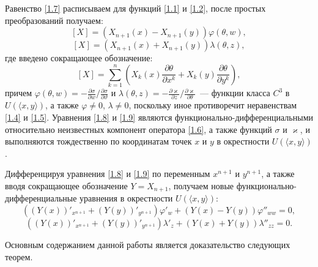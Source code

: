 Равенство \eqref{1.7} расписываем  для  функций \eqref{1.1} и \eqref{1.2}, после простых преобразований получаем:
\begin{equation}\label{1.8}[X] = (X_{n+1}(x) - X_{n+1}(y))\varphi(\theta,w), \end{equation}
\begin{equation}\label{1.9}\left[X\right] = (X_{n+1}(x) + X_{n+1}(y))\lambda(\theta,z),\end{equation}
где введено сокращающее обозначение:
$$[X] = \sum^{n}_{k=1}\left(X_k(x)\dfrac{\partial\theta}{\partial x^k} +
X_k(y)\dfrac{\partial\theta}{\partial y^k}\right),$$ причем $\varphi(\theta,w) = -\frac{\partial \sigma}{\partial w}/\frac{\partial \sigma}{\partial \vartheta}$ и $\lambda(\theta,z) = -\frac{\partial \varkappa}{\partial z}/\frac{\partial \varkappa}{\partial \theta}$~--- функции  класса $C^3$ в $U(\langle x,y\rangle)$, а также $\varphi\ne0$, $\lambda\ne0$, поскольку иное противоречит неравенствам \eqref{1.4} и \eqref{1.5}.
Уравнения  \eqref{1.8} и \eqref{1.9}  являются  функционально-дифференциальными относительно неизвестных компонент оператора \eqref{1.6}, а также функций $\sigma$ и $\varkappa$, и выполняются  тождественно по координатам точек $x$ и $y$ в окрестности $U(\langle x,y\rangle)$.

Дифференцируя уравнения \eqref{1.8} и \eqref{1.9} по переменным $x^{n+1}$ и $y^{n+1}$, а также вводя сокращающее обозначение $Y= X_{n+1}$, получаем новые функционально-дифференциальные уравнения в окрестности $U(\langle x,y\rangle)$:
\begin{equation}\label{1.10} ((Y(x))'_{x^{n+1}} + (Y(y))'_{y^{n+1}})\varphi'_{w} + (Y(x) - Y(y))\varphi''_{ww} = 0, \end{equation}
\begin{equation}\label{1.11} ((Y(x))'_{x^{n+1}} + (Y(y))'_{y^{n+1}})\lambda'_{z} + (Y(x) + Y(y))\lambda''_{zz} = 0. \end{equation}

Основным содержанием данной работы является доказательство следующих теорем.

